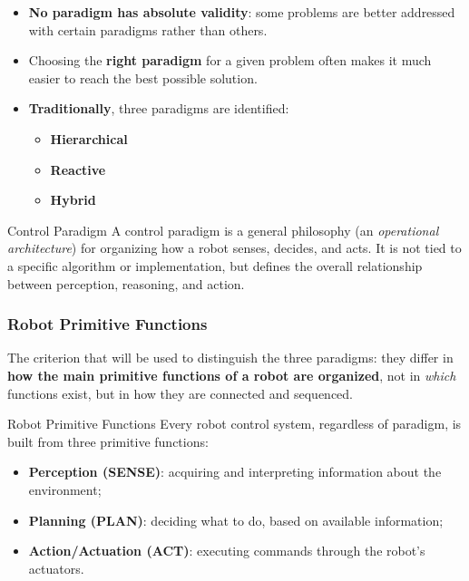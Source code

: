 \begin{itemize}
    \item \textbf{No paradigm has absolute validity}: some problems are better addressed with certain paradigms rather than others.
    \item Choosing the \textbf{right paradigm} for a given problem often makes it much easier to reach the best possible solution.
    \item \textbf{Traditionally}, three paradigms are identified:
    \begin{itemize}
        \item \textbf{Hierarchical}
        \item \textbf{Reactive}
        \item \textbf{Hybrid}
    \end{itemize}
\end{itemize}

\begin{defbox}{Control Paradigm}
A control paradigm is a general philosophy (an \textit{operational architecture}) for organizing how a robot senses, decides, and acts. It is not tied to a specific algorithm or implementation, but defines the overall relationship between perception, reasoning, and action.
\end{defbox}



\subsubsection{Robot Primitive Functions}

 The criterion that will be used to distinguish the three paradigms: they differ in \textbf{how the main primitive functions of a robot are organized}, not in \textit{which} functions exist, but in how they are connected and sequenced.

\begin{defbox}{Robot Primitive Functions}
Every robot control system, regardless of paradigm, is built from three primitive functions:
\begin{itemize}
    \item \textbf{Perception (SENSE)}: acquiring and interpreting information about the environment;
    \item \textbf{Planning (PLAN)}: deciding what to do, based on available information;
    \item \textbf{Action/Actuation (ACT)}: executing commands through the robot's actuators.
\end{itemize}
\end{defbox}

